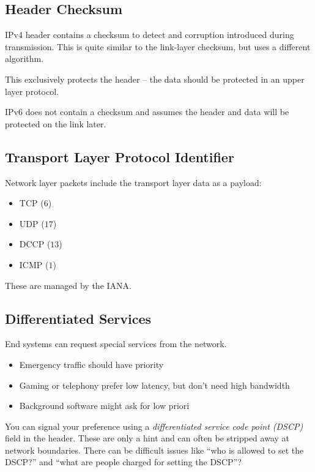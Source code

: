 \subsection{Header Checksum}\label{sub:header_checksum}

IPv4 header contains a checksum to detect and corruption introduced during transmission.
This is quite similar to the link-layer checksum, but uses a different algorithm.
\begin{note}
    This exclusively protects the header -- the data should be protected in an upper layer protocol.
\end{note}
\noindent
IPv6 does not contain a checksum and assumes the header and data will be protected on the link later.

\subsection{Transport Layer Protocol Identifier}\label{sub:transport_layer_protocol_identifier}

Network layer packets include the transport layer data as a payload:
\begin{itemize}
    \item TCP (\(6\))
    \item UDP (\(17\))
    \item DCCP (\(13\))
    \item ICMP (\(1\))
\end{itemize}
These are managed by the IANA.

\subsection{Differentiated Services}\label{sub:differentiated_services}

End systems can request special services from the network.
\begin{itemize}
    \item Emergency traffic should have priority
    \item Gaming or telephony prefer low latency, but don't need high bandwidth
    \item Background software might ask for low priori
\end{itemize}
You can signal your preference using a \emph{differentiated service code point (DSCP)} field in the header.
These are only a hint and can often be stripped away at network boundaries.
There can be difficult issues like ``who is allowed to set the DSCP?'' and ``what are people charged for setting the DSCP''?

